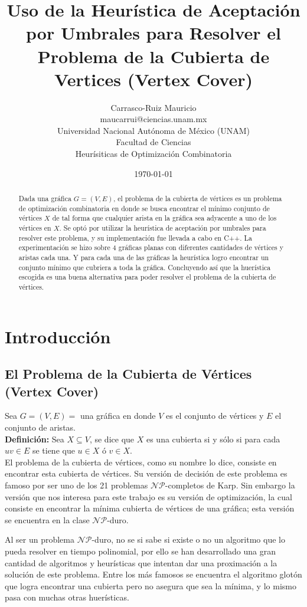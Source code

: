 \documentclass{article}
\title{Uso de la Heurística de Aceptación por Umbrales para Resolver
       el Problema de la Cubierta de Vertices (Vertex Cover)}
\author{Carrasco-Ruiz Mauricio  \\
	maucarrui@ciencias.unam.mx  \\
        Universidad Nacional Autónoma de México (UNAM) \\
        Facultad de Ciencias \\
        Heurísiticas de Optimización Combinatoria \\
	}
\date{\today}
\newcommand{\tbf}[1]{\textbf{#1}}
\newcommand{\np}{\mathcal{NP}}
\begin{document}
  \maketitle

  \begin{abstract}
    Dada una gráfica $G = (V, E)$, el problema de la cubierta 
    de vértices es un problema de optimización combinatoria en 
    donde se busca encontrar el mínimo conjunto de vértices $X$
    de tal forma que cualquier arista en la gráfica sea adyacente
    a uno de los vértices en $X$. Se optó por utilizar la heurística
    de aceptación por umbrales para resolver este problema, y su 
    implementación fue llevada a cabo en C++. La experimentación
    se hizo sobre 4 gráficas planas con diferentes cantidades de 
    vértices y aristas cada una. Y para cada una de las gráficas 
    la heurística logro encontrar un conjunto mínimo que cubriera 
    a toda la gráfica. Concluyendo así que la huerística escogida 
    es una buena alternativa para poder resolver el problema de
    la cubierta de vértices.
  \end{abstract}

  \section{Introducción} \label{intro}
  
  \subsection{El Problema de la Cubierta de Vértices (Vertex Cover)}
  Sea $G = (V, E)=$ una gráfica en donde $V$ es el conjunto de 
  vértices y $E$ el conjunto de aristas. \\

  \tbf{Definición:} Sea $X \subseteq V$, se dice que $X$ es una 
  cubierta si y sólo si para cada $uv \in E$ se tiene que 
  $u \in X$ ó $v \in X$. \\

  El problema de la cubierta de vértices, como su nombre lo dice, 
  consiste en encontrar esta cubierta de vértices. Su versión de 
  decisión de este problema es famoso por ser uno de los 21 
  problemas $\np$-completos de Karp. Sin embargo la versión que nos 
  interesa para este trabajo es su versión de optimización, la 
  cual consiste en encontrar la mínima cubierta de vértices de una
  gráfica; esta versión se encuentra en la clase $\np$-duro.

  Al ser un problema $\np$-duro, no se si sabe si existe o no 
  un algoritmo que lo pueda resolver en tiempo polinomial, por ello
  se han desarrollado una gran cantidad de algoritmos y heurísticas 
  que intentan dar una proximación a la solución de este problema. 
  Entre los más famosos se encuentra el algoritmo glotón
  que logra encontrar una cubierta pero no asegura que sea la mínima,
  y lo mismo pasa con muchas otras huerísticas.
\end{document}
